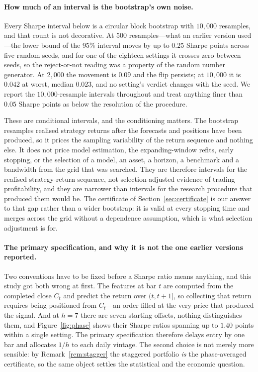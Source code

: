 \documentclass{article}
\theoremstyle{plain}
\theoremstyle{definition}
\begin{document}
\paragraph{How much of an interval is the bootstrap's own noise.} Every Sharpe interval below
is a circular block bootstrap with $10{,}000$ resamples, and that count is not decorative. At
$500$ resamples---what an earlier version used---the lower bound of the 95\% interval moves by
up to $0.25$ Sharpe points across five random seeds, and for one of the eighteen settings it
crosses zero between seeds, so the reject-or-not reading was a property of the random number
generator. At $2{,}000$ the movement is $0.09$ and the flip persists; at $10{,}000$ it is
$0.042$ at worst, median $0.023$, and no setting's verdict changes with the seed. We report
the $10{,}000$-resample intervals throughout and treat anything finer than $0.05$ Sharpe
points as below the resolution of the procedure.

These are conditional intervals, and the conditioning matters. The bootstrap resamples
realised strategy returns after the forecasts and positions have been produced, so it prices
the sampling variability of the return sequence and nothing else. It does not price model
estimation, the expanding-window refits, early stopping, or the selection of a model, an
asset, a horizon, a benchmark and a bandwidth from the grid that was searched. They are
therefore intervals for the realised strategy-return sequence, not selection-adjusted evidence
of trading profitability, and they are narrower than intervals for the research procedure that
produced them would be. The certificate of Section~\ref{sec:certificate} is our answer to
that gap rather than a wider bootstrap: it is valid at every stopping time and merges across
the grid without a dependence assumption, which is what selection adjustment is for.

\paragraph{The primary specification, and why it is not the one earlier versions reported.}
Two conventions have to be fixed before a Sharpe ratio means anything, and this study got
both wrong at first. The features at bar $t$ are computed from the completed close $C_t$ and
predict the return over $(t,t+1]$, so collecting that return requires being positioned from
$C_t$---an order filled at the very price that produced the signal. And at $h=7$ there are
seven starting offsets, nothing distinguishes them, and Figure~\ref{fig:phase} shows their
Sharpe ratios spanning up to $1.40$ points within a single setting. The primary specification
therefore delays entry by one bar and allocates $1/h$ to each daily vintage. The second
choice is not merely more sensible: by Remark~\ref{rem:stagger} the staggered portfolio
\emph{is} the phase-averaged certificate, so the same object settles the statistical and the
economic question.
\end{document}
